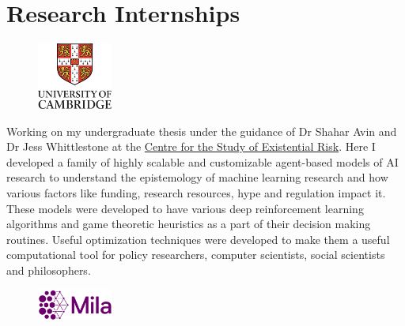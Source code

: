 \documentclass[]{deedy-resume-openfont}
\begin{document}
\begin{minipage}[t]{0.66\textwidth}

\section{Research Internships}
\begin{figure}
  \begin{center}
    \includegraphics[width=0.22\textwidth]{cam_logo.jpg}
  \end{center}
\end{figure}
Working on my undergraduate thesis under the guidance of Dr Shahar Avin and Dr Jess Whittlestone at the \href{https://www.cser.ac.uk/}{Centre for the Study of Existential Risk}. Here I developed a family of highly scalable and customizable agent-based models of AI research to understand the epistemology of machine learning research and how various factors like funding, research resources, hype and regulation impact it. These models were developed to have various deep reinforcement learning algorithms and game theoretic heuristics as a part of their decision making routines. Useful optimization techniques were developed to make them a useful computational tool for policy researchers, computer scientists, social scientists and philosophers.


\sectionsep


\begin{figure}
  \begin{center}
    \includegraphics[width=0.22\textwidth]{mila.png}
  \end{center}
\end{figure}


\end{minipage}
\end{document}
